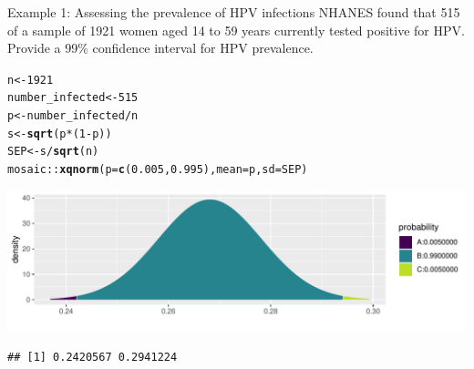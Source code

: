 \documentclass{beamer}\usepackage[]{graphicx}\usepackage[]{color}
\newcommand{\hlnum}[1]{\textcolor[rgb]{0.686,0.059,0.569}{#1}}%
\newcommand{\hlopt}[1]{\textcolor[rgb]{0,0,0}{#1}}%
\newcommand{\hlstd}[1]{\textcolor[rgb]{0.345,0.345,0.345}{#1}}%
\newcommand{\hlkwb}[1]{\textcolor[rgb]{0.69,0.353,0.396}{#1}}%
\newcommand{\hlkwc}[1]{\textcolor[rgb]{0.333,0.667,0.333}{#1}}%
\newcommand{\hlkwd}[1]{\textcolor[rgb]{0.737,0.353,0.396}{\textbf{#1}}}%
\newenvironment{knitrout}{}{} %
\begin{document}
\begin{frame}[fragile]{Example 1: Assessing the prevalence of HPV infections}
\small
NHANES found that 515 of a sample of 1921 women aged 14 to 59 years currently tested positive for HPV. Provide a 99\% confidence interval for HPV prevalence. 

\begin{knitrout}\scriptsize
{}\color{fgcolor}
\begin{alltt}
\hlstd{n} \hlkwb{<-} \hlnum{1921}
\hlstd{number_infected} \hlkwb{<-} \hlnum{515}
\hlstd{p} \hlkwb{<-} \hlstd{number_infected} \hlopt{/} \hlstd{n}
\hlstd{s} \hlkwb{<-} \hlkwd{sqrt}\hlstd{(p} \hlopt{*} \hlstd{(}\hlnum{1} \hlopt{-} \hlstd{p))}
\hlstd{SEP} \hlkwb{<-} \hlstd{s} \hlopt{/} \hlkwd{sqrt}\hlstd{(n)}
\hlstd{mosaic}\hlopt{::}\hlkwd{xqnorm}\hlstd{(}\hlkwc{p}\hlstd{=}\hlkwd{c}\hlstd{(}\hlnum{0.005}\hlstd{,}\hlnum{0.995}\hlstd{),} \hlkwc{mean} \hlstd{= p,} \hlkwc{sd} \hlstd{= SEP)}
\end{alltt}


{\centering \includegraphics[width=1\linewidth]{figure/unnamed-chunk-12-1} 

}


\begin{verbatim}
## [1] 0.2420567 0.2941224
\end{verbatim}

\end{knitrout}

\end{frame}
\end{document}
